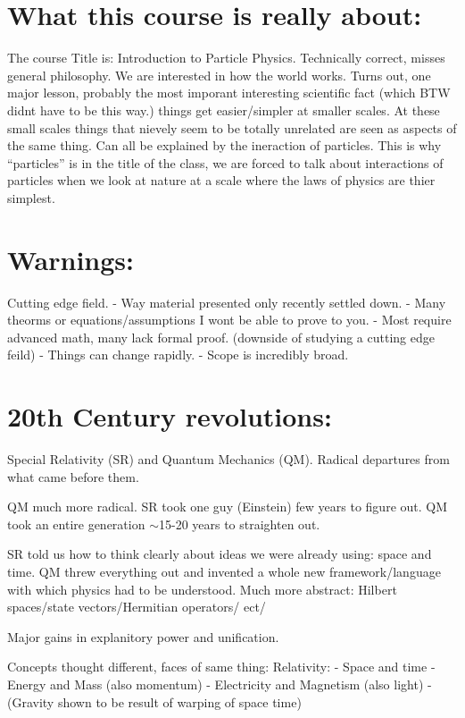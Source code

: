
\usepackage{braket}

\def\ketY{\ensuremath{\ket {\Psi}}}



\section{What this course is really about:}
The course Title is: Introduction to Particle Physics.
Technically correct, misses general philosophy. 
We are interested in how the world works. 
Turns out, one major lesson, probably the most imporant interesting scientific fact (which BTW didnt have to be this way.) things get easier/simpler at smaller scales. 
At these small scales things that nievely seem to be totally unrelated are seen as aspects of the same thing. 
Can all be explained by the ineraction of particles. 
This is why ``particles'' is in the title of the class, we are forced to talk about interactions of particles when we look at nature at a scale where the laws of physics are thier simplest. 

\section{Warnings:}
Cutting edge field. 
- Way material presented only recently settled down. 
- Many theorms or equations/assumptions I wont be able to prove to you. 
- Most require advanced math, many lack formal proof.  (downside of studying a cutting edge feild)
- Things can change rapidly. 
- Scope is incredibly broad. 

\section{20th Century revolutions:}
Special Relativity (SR) and Quantum Mechanics (QM).
Radical departures from what came before them.

QM much more radical. 
SR took one guy (Einstein) few years to figure out. 
QM took an entire generation $\sim$15-20 years to straighten out. 

SR told us how to think clearly about ideas we were already using: space and time. 
QM threw everything out and invented a whole new framework/language with which physics had to be understood.
Much more abstract: Hilbert spaces/state vectors/Hermitian operators/ ect/

Major gains in explanitory power and unification.

Concepts thought different, faces of same thing:
Relativity:
- Space and time
- Energy and Mass (also momentum)
- Electricity and Magnetism (also light)
- (Gravity shown to be result of warping of space time)

